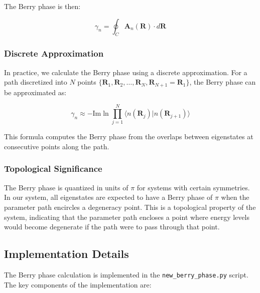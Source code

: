 The Berry phase is then:

\begin{equation}
\gamma_n = \oint_C \mathbf{A}_n(\mathbf{R}) \cdot d\mathbf{R}
\end{equation}

\subsubsection{Discrete Approximation}

In practice, we calculate the Berry phase using a discrete approximation. For a path discretized into $N$ points $\{\mathbf{R}_1, \mathbf{R}_2, \ldots, \mathbf{R}_N, \mathbf{R}_{N+1}=\mathbf{R}_1\}$, the Berry phase can be approximated as:

\begin{equation}
\gamma_n \approx -\text{Im}\ln \prod_{j=1}^{N} \langle n(\mathbf{R}_j)|n(\mathbf{R}_{j+1})\rangle
\end{equation}

This formula computes the Berry phase from the overlaps between eigenstates at consecutive points along the path.

\subsubsection{Topological Significance}

The Berry phase is quantized in units of $\pi$ for systems with certain symmetries. In our system, all eigenstates are expected to have a Berry phase of $\pi$ when the parameter path encircles a degeneracy point. This is a topological property of the system, indicating that the parameter path encloses a point where energy levels would become degenerate if the path were to pass through that point.

\subsection{Implementation Details}

The Berry phase calculation is implemented in the \texttt{new\_berry\_phase.py} script. The key components of the implementation are:

